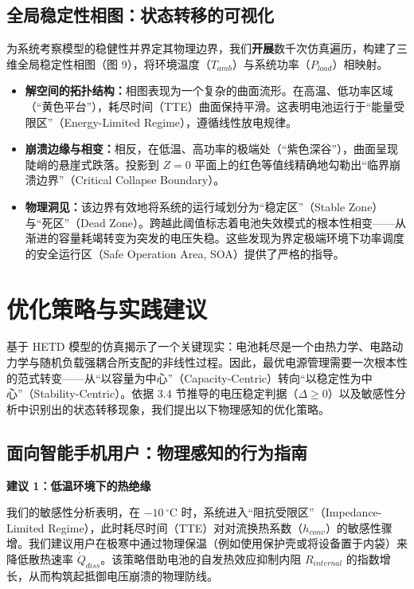 \documentclass[11pt,a4paper]{ctexart}
\begin{document}
\subsection{全局稳定性相图：状态转移的可视化}

为系统考察模型的稳健性并界定其物理边界，我们\textbf{开展}数千次仿真遍历，构建了三维全局稳定性相图（图 9），将环境温度（$T_{amb}$）与系统功率（$P_{load}$）相映射。

\begin{itemize}[leftmargin=1.6em,itemsep=0.4em]
\item \textbf{解空间的拓扑结构：}相图表现为一个复杂的曲面流形。在高温、低功率区域（“黄色平台”），耗尽时间（TTE）曲面保持平滑。这表明电池运行于“能量受限区”（Energy-Limited Regime），遵循线性放电规律。

\item \textbf{崩溃边缘与相变：}相反，在低温、高功率的极端处（“紫色深谷”），曲面呈现陡峭的悬崖式跌落。投影到 $Z = 0$ 平面上的红色等值线精确地勾勒出“临界崩溃边界”（Critical Collapse Boundary）。

\item \textbf{物理洞见：}该边界有效地将系统的运行域划分为“稳定区”（Stable Zone）与“死区”（Dead Zone）。跨越此阈值标志着电池失效模式的根本性相变——从渐进的容量耗竭转变为突发的电压失稳。这些发现为界定极端环境下功率调度的安全运行区（Safe Operation Area, SOA）提供了严格的指导。
\end{itemize}

\section{优化策略与实践建议}

基于 HETD 模型的仿真揭示了一个关键现实：电池耗尽是一个由热力学、电路动力学与随机负载强耦合所支配的非线性过程。因此，最优电源管理需要一次根本性的范式转变——从“以容量为中心”（Capacity-Centric）转向“以稳定性为中心”（Stability-Centric）。依据 3.4 节推导的电压稳定判据（$\Delta \ge 0$）以及敏感性分析中识别出的状态转移现象，我们提出以下物理感知的优化策略。

\subsection{面向智能手机用户：物理感知的行为指南}

\noindent\textbf{建议 1：低温环境下的热绝缘}

我们的敏感性分析表明，在 $-10\,^{\circ}\mathrm{C}$ 时，系统进入“阻抗受限区”（Impedance-Limited Regime），此时耗尽时间（TTE）对对流换热系数（$h_{conv}$）的敏感性骤增。我们建议用户在极寒中通过物理保温（例如使用保护壳或将设备置于内袋）来降低散热速率 $\dot{Q}_{diss}$。该策略借助电池的自发热效应抑制内阻 $R_{internal}$ 的指数增长，从而构筑起抵御电压崩溃的物理防线。
\end{document}
